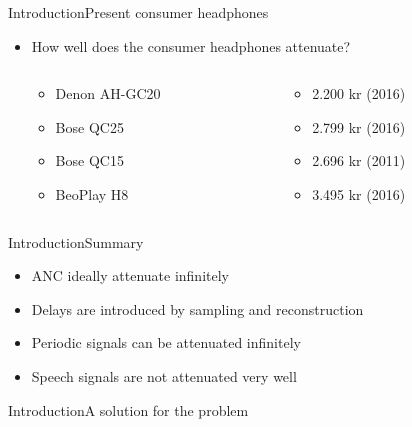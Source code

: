 \begin{frame}{Introduction}{Present consumer headphones}
	\begin{itemize}	
	\item How well does the consumer headphones attenuate?
	\begin{columns}
		\begin{column}{0.27\textwidth}
		\begin{itemize}
			\item Denon AH-GC20
			\item Bose QC25 
			\item Bose QC15 	
			\item BeoPlay H8 	
		\end{itemize}
		\end{column}
		\begin{column}{0.6\textwidth} 
		\begin{itemize}
			\item[] 2.200 kr (2016)
			\item[] 2.799 kr (2016)
			\item[] 2.696 kr (2011)
			\item[] 3.495 kr (2016)
		\end{itemize}
		\end{column}
	\end{columns}
	\end{itemize}			
	\begin{center}
		
	\end{center}	
\end{frame}

\begin{frame}{Introduction}{Summary}		
	\begin{itemize}
		\item ANC ideally attenuate infinitely 
		\item Delays are introduced by sampling and reconstruction
		\item Periodic signals can be attenuated infinitely
		\item Speech signals are not attenuated very well
	\end{itemize}
\end{frame}


\begin{frame}{Introduction}{A solution for the problem}		
\end{frame}


